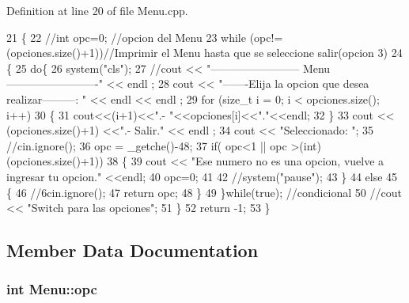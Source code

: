 Definition at line 20 of file Menu.\-cpp.


\begin{DoxyCode}
21 \{
22     \textcolor{comment}{//int opc=0; //opcion del Menu}
23     \textcolor{keywordflow}{while} (opc!=(opciones.size()+1))\textcolor{comment}{//Imprimir el Menu hasta que se seleccione salir(opcion 3)}
24     \{
25         \textcolor{keywordflow}{do}\{
26             system(\textcolor{stringliteral}{"cls"});
27             \textcolor{comment}{//cout << "------------------------ Menu -------------------------" << endl ;}
28             cout << \textcolor{stringliteral}{"-------Elija la opcion que desea realizar---------: "} << endl << endl ;
29             \textcolor{keywordflow}{for} (\textcolor{keywordtype}{size\_t} i = 0; i < opciones.size(); i++)
30             \{
31                 cout<<(i+1)<<\textcolor{stringliteral}{".- "}<<opciones[i]<<\textcolor{stringliteral}{"."}<<endl;
32             \}
33             cout << (opciones.size()+1) <<\textcolor{stringliteral}{".- Salir."} << endl ;
34             cout << \textcolor{stringliteral}{"Seleccionado: "};
35             \textcolor{comment}{//cin.ignore();}
36             opc = \_getche()-48;
37             \textcolor{keywordflow}{if}( opc<1 || opc >(\textcolor{keywordtype}{int})(opciones.size()+1))
38             \{
39                 cout << \textcolor{stringliteral}{"Ese numero no es una opcion, vuelve a ingresar tu opcion."} <<endl;
40                 opc=0;
41 
42                 \textcolor{comment}{//system("pause");}
43             \}
44             \textcolor{keywordflow}{else}
45             \{
46                 \textcolor{comment}{//6cin.ignore();}
47                 \textcolor{keywordflow}{return} opc;
48             \}
49         \}\textcolor{keywordflow}{while}(\textcolor{keyword}{true}); \textcolor{comment}{//condicional}
50         \textcolor{comment}{//cout << "Switch para las opciones";}
51     \}
52     \textcolor{keywordflow}{return} -1;
53 \}
\end{DoxyCode}


\subsection{Member Data Documentation}
\subsubsection[{opc}]{\setlength{\rightskip}{0pt plus 5cm}int Menu\-::opc\hspace{0.3cm}{\ttfamily [private]}}\label{class_menu_adc288494315cce3604f06e521d13b0e4}


